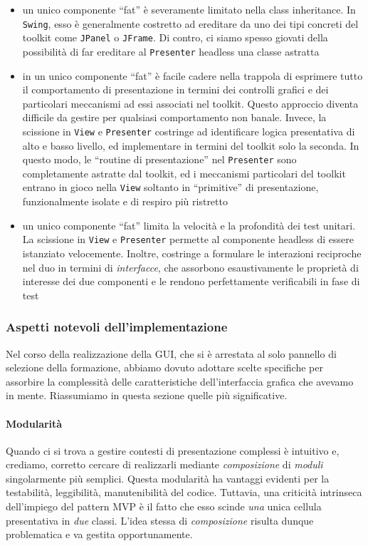\begin{itemize}
	\item un unico componente ``fat'' è severamente limitato nella class inheritance. In \texttt{Swing}, esso è generalmente costretto ad ereditare da uno dei tipi concreti del toolkit come \texttt{JPanel} o \texttt{JFrame}. Di contro, ci siamo spesso giovati della possibilità di far ereditare al \texttt{Presenter} headless una classe astratta
	\item in un unico componente ``fat'' è facile cadere nella trappola di esprimere tutto il comportamento di presentazione in termini dei controlli grafici e dei particolari meccanismi ad essi associati nel toolkit. Questo approccio diventa difficile da gestire per qualsiasi comportamento non banale. Invece, la scissione in \texttt{View} e \texttt{Presenter} costringe ad identificare logica presentativa di alto e basso livello, ed implementare in termini del toolkit solo la seconda. In questo modo, le ``routine di presentazione'' nel \texttt{Presenter} sono completamente astratte dal toolkit, ed i meccanismi particolari del toolkit entrano in gioco nella \texttt{View} soltanto in ``primitive'' di presentazione, funzionalmente isolate e di respiro più ristretto
	\item un unico componente ``fat'' limita la velocità e la profondità dei test unitari. La scissione in \texttt{View} e \texttt{Presenter} permette al componente headless di essere istanziato velocemente. Inoltre, costringe a formulare le interazioni reciproche nel duo in termini di \emph{interfacce}, che assorbono esaustivamente le proprietà di interesse dei due componenti e le rendono perfettamente verificabili in fase di test 
\end{itemize}

\subsubsection{Aspetti notevoli dell'implementazione}
Nel corso della realizzazione della GUI, che si è arrestata al solo pannello di selezione della formazione, abbiamo dovuto adottare scelte specifiche per assorbire la complessità delle caratteristiche dell'interfaccia grafica che avevamo in mente. 
Riassumiamo in questa sezione quelle più significative.

\paragraph{Modularità}
Quando ci si trova a gestire contesti di presentazione complessi è intuitivo e, crediamo, corretto cercare di realizzarli mediante \emph{composizione} di \emph{moduli} singolarmente più semplici. Questa modularità ha vantaggi evidenti per la testabilità, leggibilità, manutenibilità del codice.
Tuttavia, una criticità intrinseca dell'impiego del pattern MVP è il fatto che esso scinde \emph{una} unica cellula presentativa in \emph{due} classi. L'idea stessa di \emph{composizione} risulta dunque problematica e va gestita opportunamente.

